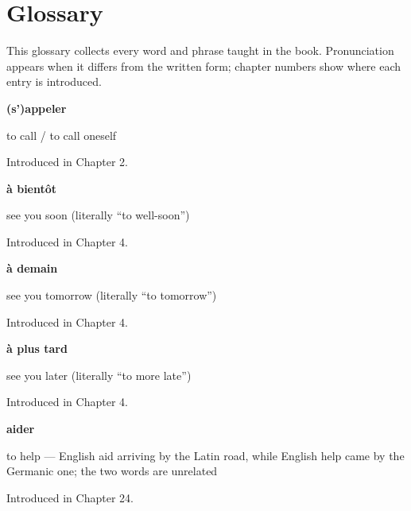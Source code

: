
\chapter*{Glossary}

This glossary collects every word and phrase taught in the book. Pronunciation appears when it differs from the written form; chapter numbers show where each entry is introduced.

\noindent\begin{minipage}[t]{\linewidth}
\raggedright
\textbf{(s')appeler}\par
\small to call / to call oneself\par
\footnotesize Introduced in Chapter 2.
\end{minipage}\par\medskip

\noindent\begin{minipage}[t]{\linewidth}
\raggedright
\textbf{à bientôt}\par
\small see you soon (literally \textquotedblleft{}to well-soon\textquotedblright{})\par
\footnotesize Introduced in Chapter 4.
\end{minipage}\par\medskip

\noindent\begin{minipage}[t]{\linewidth}
\raggedright
\textbf{à demain}\par
\small see you tomorrow (literally \textquotedblleft{}to tomorrow\textquotedblright{})\par
\footnotesize Introduced in Chapter 4.
\end{minipage}\par\medskip

\noindent\begin{minipage}[t]{\linewidth}
\raggedright
\textbf{à plus tard}\par
\small see you later (literally \textquotedblleft{}to more late\textquotedblright{})\par
\footnotesize Introduced in Chapter 4.
\end{minipage}\par\medskip

\noindent\begin{minipage}[t]{\linewidth}
\raggedright
\textbf{aider}\par
\small to help — English aid arriving by the Latin road, while English help came by the Germanic one; the two words are unrelated\par
\footnotesize Introduced in Chapter 24.
\end{minipage}\par\medskip

